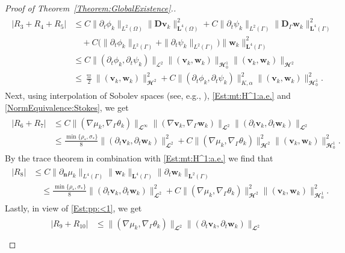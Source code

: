 \documentclass[10pt,reqno]{amsart}
\theoremstyle{remark}
\numberwithin{equation}{section}
\newcommand{\abs}[1]{| #1 |}
\newcommand{\norm}[1]{\| #1 \|}
\newcommand{\n}{\mathbf{n}}
\newcommand{\bv}{\mathbf{v}}
\newcommand{\bw}{\mathbf{w}}
\newcommand{\D}{\mathbf{D}}
\newcommand{\Dg}{\mathbf{D}_\Gamma}
\newcommand{\delt}{\partial_{t}}
\newcommand{\deln}{\partial_\n}
\newcommand{\Grad}{\nabla}
\newcommand{\Gradg}{\nabla_\Ga}
\newcommand{\Om}{\Omega}
\newcommand{\Ga}{\Gamma}
\begin{document}
\begin{proof}[Proof of Theorem~\ref{Theorem:GlobalExistence}.]
\begin{align}
    \begin{split}
        \abs{R_3 + R_4 + R_5} &\leq C\norm{\delt\phi_k}_{L^2(\Om)}\norm{\D\bv_k}_{\mathbf{L}^4(\Om)}^2 + C\norm{\delt\psi_k}_{L^2(\Ga)}\norm{\Dg\bw_k}_{\mathbf{L}^4(\Ga)}^2 \\
        &\quad + C\big(\norm{\delt\phi_k}_{L^2(\Ga)} + \norm{\delt\psi_k}_{L^2(\Ga)}\big)\norm{\bw_k}_{\mathbf{L}^4(\Ga)}^2 \\
        &\leq C\norm{(\delt\phi_k,\delt\psi_k)}_{\mathcal{L}^2}\norm{(\bv_k,\bw_k)}_{\mathbfcal{H}^1_{0}}\norm{(\bv_k,\bw_k)}_{\mathbfcal{H}^2} \\
        &\leq\frac{\varpi}{2}\norm{(\bv_k,\bw_k)}_{\mathbfcal{H}^2}^2 + C\norm{(\delt\phi_k,\delt\psi_k)}_{K,\alpha}^2\norm{(\bv_k,\bw_k)}_{\mathbfcal{H}^1_{0}}^2.
    \end{split}
\end{align}
Next, using interpolation of Sobolev spaces (see, e.g., \cite[Lemma~2.2]{Colli2023}), \eqref{Est:mt:H^1:a.e.} and \eqref{NormEquivalence:Stokes}, we get
\begin{align}\label{Est:R6R7}
    \begin{split}
        \abs{R_6 + R_7} &\leq C\norm{(\Grad\mu_k,\Gradg\theta_k)}_{\mathbfcal{L}^\infty}\norm{(\Grad\bv_k,\Gradg\bw_k)}_{\mathbfcal{L}^2}\norm{(\delt\bv_k,\delt\bw_k)}_{\mathbfcal{L}^2} \\
        &\leq \frac{\min\{\rho_\ast,\sigma_\ast\}}{8}\norm{(\delt\bv_k,\delt\bw_k)}_{\mathbfcal{L}^2}^2 + C\norm{(\Grad\mu_k,\Gradg\theta_k)}_{\mathbfcal{H}^2}^2\norm{(\bv_k,\bw_k)}_{\mathbfcal{H}^1_{0}}^2.
    \end{split}
\end{align}
By the trace theorem in combination with \eqref{Est:mt:H^1:a.e.} we find that
\begin{align}\label{Est:R8}
    \begin{split}
        \abs{R_8} &\leq C\norm{\deln\mu_k}_{L^4(\Ga)}\norm{\bw_k}_{\mathbf{L}^4(\Ga)}\norm{\delt\bw_k}_{\mathbf{L}^2(\Ga)} \\
        &\quad\leq \frac{\min\{\rho_\ast,\sigma_\ast\}}{8}\norm{(\delt\bv_k,\delt\bw_k)}_{\mathbfcal{L}^2}^2 + C\norm{(\Grad\mu_k,\Gradg\theta_k)}_{\mathbfcal{H}^2}^2\norm{(\bv_k,\bw_k)}_{\mathbfcal{H}^1_{0}}^2.
    \end{split}
\end{align}
Lastly, in view of \eqref{Est:pp:<1}, we get
\begin{align}\label{Est:R9R10}
    \begin{split}
        \abs{R_9 + R_{10}} &\leq \norm{(\Grad\mu_k,\Gradg\theta_k)}_{\mathbfcal{L}^2}\norm{(\delt\bv_k,\delt\bw_k)}_{\mathbfcal{L}^2} \\

\end{split}
\end{align}
\end{proof}
\end{document}
